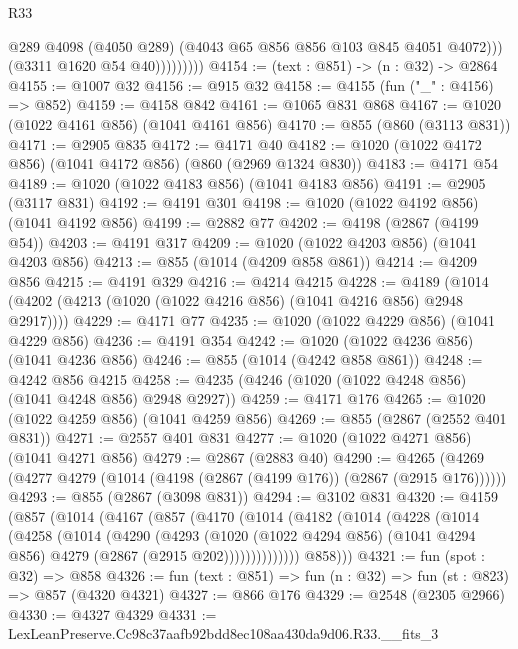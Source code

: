 \begin{lexlean}{R33}
\begin{coremodule}
                        @289
                        @4098
                        (@4050 @289)
                        (@4043 @65 @856 @856 @103 @845 @4051 @4072)))
                    (@3311 @1620 @54 @40)))))))))
@4154 := (text : @851) -> (n : @32) -> @2864
@4155 := @1007 @32
@4156 := @915 @32
@4158 := @4155 (fun ("_" : @4156) => @852)
@4159 := @4158 @842
@4161 := @1065 @831 @868
@4167 := @1020 (@1022 @4161 @856) (@1041 @4161 @856)
@4170 := @855 (@860 (@3113 @831))
@4171 := @2905 @835
@4172 := @4171 @40
@4182 := @1020 (@1022 @4172 @856) (@1041 @4172 @856) (@860 (@2969 @1324 @830))
@4183 := @4171 @54
@4189 := @1020 (@1022 @4183 @856) (@1041 @4183 @856)
@4191 := @2905 (@3117 @831)
@4192 := @4191 @301
@4198 := @1020 (@1022 @4192 @856) (@1041 @4192 @856)
@4199 := @2882 @77
@4202 := @4198 (@2867 (@4199 @54))
@4203 := @4191 @317
@4209 := @1020 (@1022 @4203 @856) (@1041 @4203 @856)
@4213 := @855 (@1014 (@4209 @858 @861))
@4214 := @4209 @856
@4215 := @4191 @329
@4216 := @4214 @4215
@4228 := @4189 (@1014 (@4202 (@4213 (@1020 (@1022 @4216 @856) (@1041 @4216 @856) @2948 @2917))))
@4229 := @4171 @77
@4235 := @1020 (@1022 @4229 @856) (@1041 @4229 @856)
@4236 := @4191 @354
@4242 := @1020 (@1022 @4236 @856) (@1041 @4236 @856)
@4246 := @855 (@1014 (@4242 @858 @861))
@4248 := @4242 @856 @4215
@4258 := @4235 (@4246 (@1020 (@1022 @4248 @856) (@1041 @4248 @856) @2948 @2927))
@4259 := @4171 @176
@4265 := @1020 (@1022 @4259 @856) (@1041 @4259 @856)
@4269 := @855 (@2867 (@2552 @401 @831))
@4271 := @2557 @401 @831
@4277 := @1020 (@1022 @4271 @856) (@1041 @4271 @856)
@4279 := @2867 (@2883 @40)
@4290 := @4265 (@4269 (@4277 @4279 (@1014 (@4198 (@2867 (@4199 @176)) (@2867 (@2915 @176))))))
@4293 := @855 (@2867 (@3098 @831))
@4294 := @3102 @831
@4320 := @4159
    (@857
      (@1014
        (@4167
          (@857
            (@4170
              (@1014
                (@4182
                  (@1014
                    (@4228
                      (@1014
                        (@4258
                          (@1014
                            (@4290
                              (@4293
                                (@1020
                                  (@1022 @4294 @856)
                                  (@1041 @4294 @856)
                                  @4279
                                  (@2867 (@2915 @202))))))))))))))
          @858)))
@4321 := fun (spot : @32) => @858
@4326 := fun (text : @851) => fun (n : @32) => fun (st : @823) => @857 (@4320 @4321)
@4327 := @866 @176
@4329 := @2548 (@2305 @2966)
@4330 := @4327 @4329
@4331 := LexLeanPreserve.Cc98c37aafb92bdd8ec108aa430da9d06.R33.__fits_3

\end{coremodule}
\end{lexlean}
